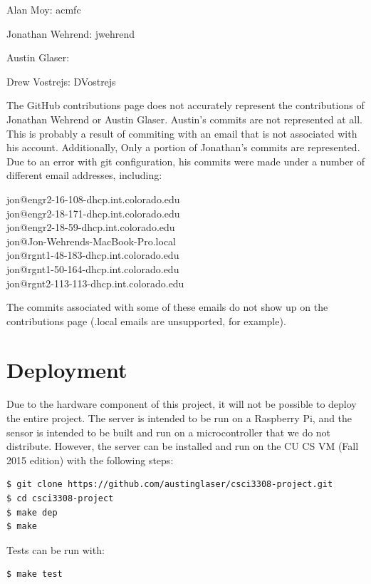 \documentclass[]{article}
\begin{document}
Alan Moy: acmfc

Jonathan Wehrend: jwehrend

Austin Glaser:

Drew Vostrejs: DVostrejs

The GitHub contributions page does not accurately represent the contributions
of Jonathan Wehrend or Austin Glaser. Austin's commits are not represented at
all. This is probably a result of commiting with an email that is not
associated with his account. Additionally, Only a portion of Jonathan's commits
are represented. Due to an error with git configuration, his commits were made
under a number of different email addresses, including:

jon@engr2-16-108-dhcp.int.colorado.edu \\
jon@engr2-18-171-dhcp.int.colorado.edu \\
jon@engr2-18-59-dhcp.int.colorado.edu \\
jon@Jon-Wehrends-MacBook-Pro.local \\
jon@rgnt1-48-183-dhcp.int.colorado.edu \\
jon@rgnt1-50-164-dhcp.int.colorado.edu \\
jon@rgnt2-113-113-dhcp.int.colorado.edu

The commits associated with some of these emails do not show up on the
contributions page (.local emails are unsupported, for example).

\section{Deployment}
Due to the hardware component of this project, it will not be possible to
deploy the entire project. The server is intended to be run on a Raspberry Pi,
and the sensor is intended to be built and run on a microcontroller that we do
not distribute. However, the server can be installed and run on the CU CS VM
(Fall 2015 edition) with the following steps:

\begin{lstlisting}[breaklines=true, frame=single]
$ git clone https://github.com/austinglaser/csci3308-project.git
$ cd csci3308-project
$ make dep
$ make
\end{lstlisting}

Tests can be run with:

\begin{lstlisting}[breaklines=true, frame=single]
$ make test
\end{lstlisting}
\end{document}
